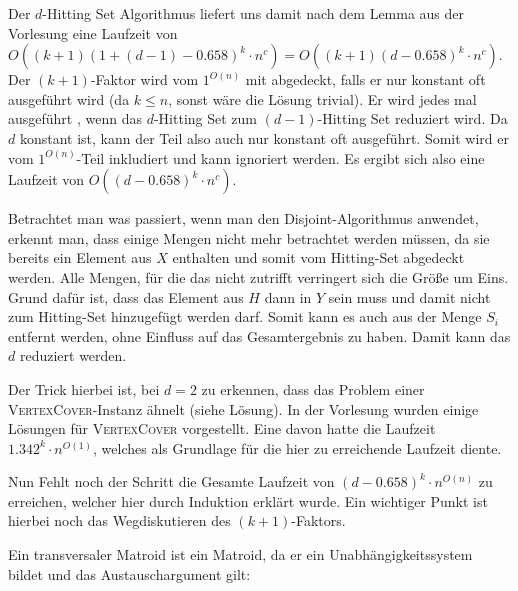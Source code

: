 Der $d$-Hitting Set Algorithmus liefert uns damit nach dem Lemma aus der Vorlesung eine Laufzeit von $O((k+1)(1+(d-1)-0.658)^k \cdot n^c) = O((k+1)(d-0.658)^k \cdot n^c)$. Der $(k+1)$-Faktor wird vom $1^{O(n)}$ mit abgedeckt, falls er nur konstant oft ausgeführt wird (da $k \leq n$, sonst wäre die Lösung trivial). Er wird jedes mal ausgeführt , wenn das $d$-Hitting Set zum $(d-1)$-Hitting Set reduziert wird. Da $d$ konstant ist, kann der Teil also auch nur konstant oft ausgeführt. Somit wird er vom $1^{O(n)}$-Teil inkludiert und kann ignoriert werden. Es ergibt sich also eine Laufzeit von $O((d-0.658)^k \cdot n^c)$.


\how
Betrachtet man was passiert, wenn man den Disjoint-Algorithmus anwendet, erkennt man, dass einige Mengen nicht mehr betrachtet werden müssen, da sie bereits ein Element aus $X$ enthalten und somit vom Hitting-Set abgedeckt werden. Alle Mengen, für die das nicht zutrifft verringert sich die Größe um Eins. Grund dafür ist, dass das Element aus $H$ dann in $Y$ sein muss und damit nicht zum Hitting-Set hinzugefügt werden darf. Somit kann es auch aus der Menge $S_i$ entfernt werden, ohne Einfluss auf das Gesamtergebnis zu haben. Damit kann das $d$ reduziert werden. 

Der Trick hierbei ist, bei $d=2$ zu erkennen, dass das Problem einer \textsc{VertexCover}-Instanz ähnelt (siehe Lösung). In der Vorlesung wurden einige Lösungen für \textsc{VertexCover} vorgestellt. Eine davon hatte die Laufzeit $1.342^k \cdot n^{O(1)}$, welches als Grundlage für die hier zu erreichende Laufzeit diente.

Nun Fehlt noch der Schritt die Gesamte Laufzeit von $(d-0.658)^k \cdot n^{O(n)}$ zu erreichen, welcher hier durch Induktion erklärt wurde. Ein wichtiger Punkt ist hierbei noch das Wegdiskutieren des $(k+1)$-Faktors.



\subexercise

Ein transversaler Matroid ist ein Matroid, da er ein Unabhängigkeitssystem bildet und das Austauschargument gilt:

